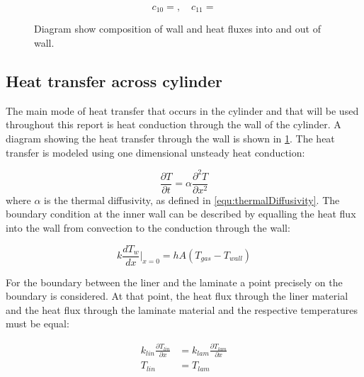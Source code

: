 \begin{equation}
c_{10} =   ,  \quad c_{11} = 
\end{equation}




\begin{figure}[H]
\begin{centering}
\caption{Diagram show composition of wall and heat fluxes into and out of wall.}
\label{fig:wall}
\end{centering}
\end{figure}


\subsection{Heat transfer across cylinder}

The main mode of heat transfer that occurs in the cylinder and that will be used throughout this report is heat conduction through the wall of the cylinder. A diagram showing the heat transfer through the wall is shown in \cref{fig:wall}. The heat transfer is modeled using one dimensional unsteady heat conduction:

\begin{equation}
\label{equ:heatEquation}
\frac{\partial T}{\partial t} = \alpha \frac{\partial^2 T }{\partial x^2}
\end{equation}
where $\alpha$ is the thermal diffusivity, as defined in \cref{equ:thermalDiffusivity}. The boundary condition at the inner wall can be described by equalling the heat flux into the wall from convection to the conduction through the wall:

\begin{equation}
\label{equ:innerWallBC}
k \frac{dT_w}{dx} \bigg\rvert_{x=0} = h A \left( T_{gas} - T_{wall} \right)
\end{equation}

For the boundary between the liner and the laminate a point precisely on the boundary is considered. At that point, the heat flux through the liner material and the heat flux through the laminate material and the respective temperatures must be equal:

\begin{equation}
\begin{aligned}
k_{lin} \frac{\partial T_{lin}}{\partial x} &=  k_{lam} \frac{\partial T_{lam}}{\partial x} \\
T_{lin} &= T_{lam}
\end{aligned}
\end{equation}

